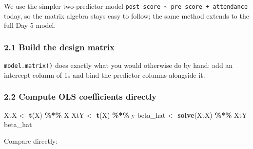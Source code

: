 \documentclass[11pt]{article}
\newenvironment{Shaded}{\begin{snugshade}}{\end{snugshade}}
\newcommand{\AttributeTok}[1]{\textcolor[rgb]{0.13,0.29,0.53}{#1}}
\newcommand{\CommentTok}[1]{\textcolor[rgb]{0.56,0.35,0.01}{\textit{#1}}}
\newcommand{\DecValTok}[1]{\textcolor[rgb]{0.00,0.00,0.81}{#1}}
\newcommand{\FunctionTok}[1]{\textcolor[rgb]{0.13,0.29,0.53}{\textbf{#1}}}
\newcommand{\NormalTok}[1]{#1}
\newcommand{\OtherTok}[1]{\textcolor[rgb]{0.56,0.35,0.01}{#1}}
\newcommand{\SpecialCharTok}[1]{\textcolor[rgb]{0.81,0.36,0.00}{\textbf{#1}}}
\begin{document}
We use the simpler two-predictor model
\texttt{post\_score\ \textasciitilde{}\ pre\_score\ +\ attendance}
today, so the matrix algebra stays easy to follow; the same method
extends to the full Day 5 model.

\hypertarget{build-the-design-matrix}{%
\subsubsection{2.1 Build the design
matrix}\label{build-the-design-matrix}}

\begin{Shaded}
\end{Shaded}

\texttt{model.matrix()} does exactly what you would otherwise do by
hand: add an intercept column of 1s and bind the predictor columns
alongside it.

\hypertarget{compute-ols-coefficients-directly}{%
\subsubsection{2.2 Compute OLS coefficients
directly}\label{compute-ols-coefficients-directly}}

\begin{Shaded}
\begin{Highlighting}[]
\NormalTok{XtX }\OtherTok{\textless{}{-}} \FunctionTok{t}\NormalTok{(X) }\SpecialCharTok{\%*\%}\NormalTok{ X}
\NormalTok{XtY }\OtherTok{\textless{}{-}} \FunctionTok{t}\NormalTok{(X) }\SpecialCharTok{\%*\%}\NormalTok{ y}
\NormalTok{beta\_hat }\OtherTok{\textless{}{-}} \FunctionTok{solve}\NormalTok{(XtX) }\SpecialCharTok{\%*\%}\NormalTok{ XtY}
\NormalTok{beta\_hat}
\end{Highlighting}
\end{Shaded}

Compare directly:
\end{document}
